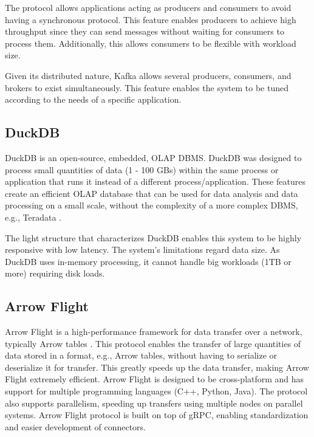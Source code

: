 The protocol allows applications acting as producers and consumers to avoid having a synchronous protocol. This feature enables producers to achieve high throughput since they can send messages without waiting for consumers to process them. Additionally, this allows consumers to be flexible with workload size.

Given its distributed nature, Kafka allows several producers, consumers, and brokers to exist simultaneously. This feature enables the system to be tuned according to the needs of a specific application. 

\subsection{DuckDB}

DuckDB \cite{raasveldtDuckDBEmbeddableAnalytical2019} is an open-source, embedded, \gls{OLAP} \gls{DBMS}. DuckDB was designed to process small quantities of data (1 - 100 GBs) within the same process or application that runs it instead of a different process/application. These features create an efficient \gls{OLAP} database that can be used for data analysis and data processing on a small scale, without the complexity of a more complex \gls{DBMS}, e.g., Teradata \cite{shahImproveYourOLAP}. 

The light structure that characterizes DuckDB enables this system to be highly responsive with low latency. The system's limitations regard data size. As DuckDB uses in-memory processing, it cannot handle big workloads (1TB or more) requiring disk loads.

\subsection{Arrow Flight}

Arrow Flight is a high-performance framework for data transfer over a network, typically Arrow tables \cite{wesmIntroducingApacheArrow2019}. This protocol enables the transfer of large quantities of data stored in a format, e.g., Arrow tables, without having to serialize or deserialize it for transfer. This greatly speeds up the data transfer, making Arrow Flight extremely efficient. Arrow Flight is designed to be cross-platform and has support for multiple programming languages (C++, Python, Java). The protocol also supports parallelism, speeding up transfers using multiple nodes on parallel systems. Arrow Flight protocol is built on top of gRPC, enabling standardization and easier development of connectors. 